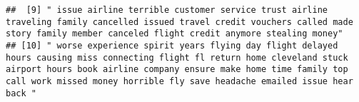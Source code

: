 \documentclass[
]{article}
\begin{document}
\begin{verbatim}
##  [9] " issue airline terrible customer service trust airline traveling family cancelled issued travel credit vouchers called made story family member canceled flight credit anymore stealing money"                                                                                                                                                                                                                                                                                                                                                                                                                                                                                                                                                                                                                                                                                                                                                                                                                                                                                                                                                                            
## [10] " worse experience spirit years flying day flight delayed hours causing miss connecting flight fl return home cleveland stuck airport hours book airline company ensure make home time family top call work missed money horrible fly save headache emailed issue hear back "
\end{verbatim}
\end{document}
